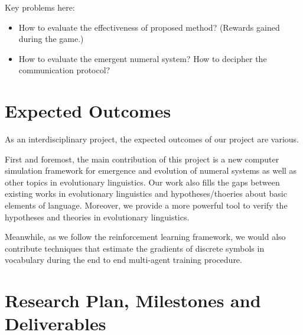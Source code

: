 \documentclass[a4paper,11pt]{article}
\begin{document}
Key problems here:

\begin{itemize}
  \item How to evaluate the effectiveness of proposed method? (Rewards gained during the game.)
  \item How to evaluate the emergent numeral system? How to decipher the communication protocol?
\end{itemize}

\section{Expected Outcomes}
\label{sec:5outcomes}

As an interdisciplinary project, the expected outcomes of our project are various.

First and foremost, the main contribution of this project is a new computer simulation framework for emergence and evolution of numeral systems as well as other topics in evolutionary linguistics. Our work also fills the gaps between existing works in evolutionary linguistics and hypotheses/thoeries about basic elements of language. Moreover, we provide a more powerful tool to verify the hypotheses and theories in evolutionary linguistics.

Meanwhile, as we follow the reinforcement learning framework, we would also contribute techniques that estimate the gradients of discrete symbols in vocabulary during the end to end multi-agent training procedure.

%


\section{Research Plan, Milestones and Deliverables}
\label{sec:6plan}

\end{document}
